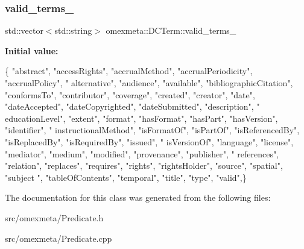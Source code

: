 \subsubsection{\texorpdfstring{valid\+\_\+terms\+\_\+}{valid\_terms\_}}
{\footnotesize\ttfamily std\+::vector$<$std\+::string$>$ omexmeta\+::\+D\+C\+Term\+::valid\+\_\+terms\+\_\+}

{\bfseries Initial value\+:}
\begin{DoxyCode}
\{
                \textcolor{stringliteral}{"abstract"}, \textcolor{stringliteral}{"accessRights"}, \textcolor{stringliteral}{"accrualMethod"}, \textcolor{stringliteral}{"accrualPeriodicity"}, \textcolor{stringliteral}{"accrualPolicy"}, \textcolor{stringliteral}{"
      alternative"},
                \textcolor{stringliteral}{"audience"}, \textcolor{stringliteral}{"available"}, \textcolor{stringliteral}{"bibliographicCitation"}, \textcolor{stringliteral}{"conformsTo"}, \textcolor{stringliteral}{"contributor"}, \textcolor{stringliteral}{"coverage"}, \textcolor{stringliteral}{
      "created"},
                \textcolor{stringliteral}{"creator"}, \textcolor{stringliteral}{"date"}, \textcolor{stringliteral}{"dateAccepted"}, \textcolor{stringliteral}{"dateCopyrighted"}, \textcolor{stringliteral}{"dateSubmitted"}, \textcolor{stringliteral}{"description"}, \textcolor{stringliteral}{"
      educationLevel"},
                \textcolor{stringliteral}{"extent"}, \textcolor{stringliteral}{"format"}, \textcolor{stringliteral}{"hasFormat"}, \textcolor{stringliteral}{"hasPart"}, \textcolor{stringliteral}{"hasVersion"}, \textcolor{stringliteral}{"identifier"}, \textcolor{stringliteral}{"
      instructionalMethod"},
                \textcolor{stringliteral}{"isFormatOf"}, \textcolor{stringliteral}{"isPartOf"}, \textcolor{stringliteral}{"isReferencedBy"}, \textcolor{stringliteral}{"isReplacedBy"}, \textcolor{stringliteral}{"isRequiredBy"}, \textcolor{stringliteral}{"issued"}, \textcolor{stringliteral}{"
      isVersionOf"},
                \textcolor{stringliteral}{"language"}, \textcolor{stringliteral}{"license"}, \textcolor{stringliteral}{"mediator"}, \textcolor{stringliteral}{"medium"}, \textcolor{stringliteral}{"modified"}, \textcolor{stringliteral}{"provenance"}, \textcolor{stringliteral}{"publisher"}, \textcolor{stringliteral}{"
      references"},
                \textcolor{stringliteral}{"relation"}, \textcolor{stringliteral}{"replaces"}, \textcolor{stringliteral}{"requires"}, \textcolor{stringliteral}{"rights"}, \textcolor{stringliteral}{"rightsHolder"}, \textcolor{stringliteral}{"source"}, \textcolor{stringliteral}{"spatial"}, \textcolor{stringliteral}{"subject
      "},
                \textcolor{stringliteral}{"tableOfContents"}, \textcolor{stringliteral}{"temporal"}, \textcolor{stringliteral}{"title"}, \textcolor{stringliteral}{"type"}, \textcolor{stringliteral}{"valid"},\}
\end{DoxyCode}


The documentation for this class was generated from the following files\+:\begin{DoxyCompactItemize}
\item 
src/omexmeta/Predicate.\+h\item 
src/omexmeta/Predicate.\+cpp\end{DoxyCompactItemize}
